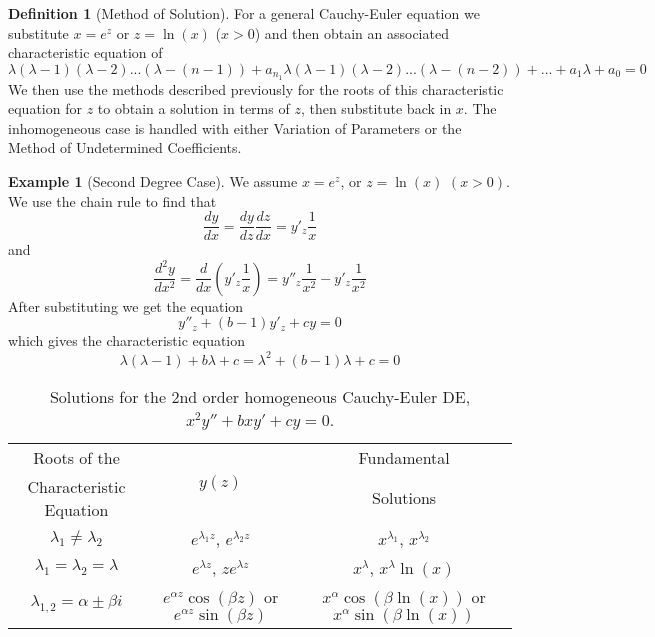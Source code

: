 \documentclass[12pt]{article}
\theoremstyle{definition}
\newtheorem{defn}[thm]{Definition}
\newtheorem{eg}[thm]{Example}
\theoremstyle{remark}
\numberwithin{equation}{section}
\newcommand\diriv[2]{\ensuremath{\frac{d #1}{d #2}}}
\begin{document}
\vspace{1cm}


\begin{defn}[Method of Solution]
        For a general Cauchy-Euler equation we substitute $x = e^z$ or $z = \ln(x)$ ($x > 0$) and then obtain an associated characteristic equation of \begin{equation}
                \lambda(\lambda - 1)(\lambda - 2)...(\lambda - (n-1)) + a_{n_1}\lambda(\lambda - 1)(\lambda - 2)...(\lambda - (n-2)) + ... + a_1\lambda + a_0 = 0
        \end{equation}
        We then use the methods described previously for the roots of this characteristic equation for $z$ to obtain a solution in terms of $z$, then substitute back in $x$. The inhomogeneous case is handled with either Variation of Parameters or the Method of Undetermined Coefficients.
\end{defn}


\vspace{1cm}


\begin{eg}[Second Degree Case]
        We assume $x = e^{z}$, or $z = \ln(x)$ $(x > 0)$. We use the chain rule to find that $$\diriv{y}{x} = \diriv{y}{z}\diriv{z}{x} = y'_z\frac{1}{x}$$
        and $$\frac{d^2y}{dx^2} = \frac{d}{dx}\left(y'_z\frac{1}{x}\right) = y''_z\frac{1}{x^2} - y'_z\frac{1}{x^2}$$ After substituting we get the equation \begin{equation}
                y''_z + (b-1)y'_z +cy = 0
        \end{equation}
        which gives the characteristic equation\begin{equation}
                \lambda(\lambda - 1) + b\lambda + c = \lambda^2 + (b-1)\lambda +c = 0
        \end{equation}
\end{eg}

\vspace{1cm}


\bgroup
\def\arraystretch{1.5}
\begin{table}[H]
        \centering
        \caption{Solutions for the 2nd order homogeneous Cauchy-Euler DE, $x^2y''+bxy'+cy=0$.}
        \begin{tabular}{c|c|c}
                Roots of the & \multirow{2}{*}{$y(z)$} & Fundamental \\
                Characteristic Equation &  & Solutions \\ \hline
                $\lambda_1 \neq \lambda_2$ & $e^{\lambda_1 z}$, $e^{\lambda_2 z}$ & $x^{\lambda_1}$, $x^{\lambda_2}$ \\
                $\lambda_1=\lambda_2=\lambda$ & $e^{\lambda z}$, $ze^{\lambda z}$ & $x^{\lambda}$, $x^{\lambda}\ln(x)$ \\
                $\lambda_{1,2} = \alpha \pm \beta i$ & $e^{\alpha z}\cos(\beta z)$ or $e^{\alpha z}\sin(\beta z)$ & $x^{\alpha}\cos(\beta\ln(x))$ or $x^{\alpha}\sin(\beta\ln(x))$ \\
        \end{tabular}
\end{table}
\egroup
\end{document}
